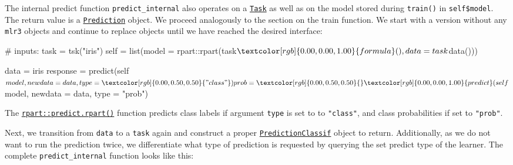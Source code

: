 \documentclass[]{article}
\newenvironment{Shaded}{}{}
\newcommand{\CommentTok}[1]{\textcolor[rgb]{0.00,0.50,0.00}{#1}}
\newcommand{\DataTypeTok}[1]{#1}
\newcommand{\KeywordTok}[1]{\textcolor[rgb]{0.00,0.00,1.00}{#1}}
\newcommand{\NormalTok}[1]{#1}
\newcommand{\OperatorTok}[1]{#1}
\newcommand{\StringTok}[1]{\textcolor[rgb]{0.00,0.50,0.50}{#1}}
\renewenvironment{Shaded} {\begin{snugshade}\small} {\end{snugshade}}
\begin{document}
The internal predict function \texttt{predict\_internal} also operates on a \href{https://mlr3.mlr-org.com/reference/Task.html}{\texttt{Task}} as well as on the model stored during \texttt{train()} in \texttt{self\$model}.
The return value is a \href{https://mlr3.mlr-org.com/reference/Prediction.html}{\texttt{Prediction}} object.
We proceed analogously to the section on the train function.
We start with a version without any \texttt{mlr3} objects and continue to replace objects until we have reached the desired interface:

\begin{Shaded}
\begin{Highlighting}[]
\CommentTok{# inputs:}
\NormalTok{task =}\StringTok{ }\KeywordTok{tsk}\NormalTok{(}\StringTok{"iris"}\NormalTok{)}
\NormalTok{self =}\StringTok{ }\KeywordTok{list}\NormalTok{(}\DataTypeTok{model =}\NormalTok{ rpart}\OperatorTok{::}\KeywordTok{rpart}\NormalTok{(task}\OperatorTok{$}\KeywordTok{formula}\NormalTok{(), }\DataTypeTok{data =}\NormalTok{ task}\OperatorTok{$}\KeywordTok{data}\NormalTok{()))}

\NormalTok{data =}\StringTok{ }\NormalTok{iris}
\NormalTok{response =}\StringTok{ }\KeywordTok{predict}\NormalTok{(self}\OperatorTok{$}\NormalTok{model, }\DataTypeTok{newdata =}\NormalTok{ data, }\DataTypeTok{type =} \StringTok{"class"}\NormalTok{)}
\NormalTok{prob =}\StringTok{ }\KeywordTok{predict}\NormalTok{(self}\OperatorTok{$}\NormalTok{model, }\DataTypeTok{newdata =}\NormalTok{ data, }\DataTypeTok{type =} \StringTok{"prob"}\NormalTok{)}
\end{Highlighting}
\end{Shaded}

The \href{https://www.rdocumentation.org/packages/rpart/topics/predict.rpart}{\texttt{rpart::predict.rpart()}} function predicts class labels if argument \texttt{type} is set to to \texttt{"class"}, and class probabilities if set to \texttt{"prob"}.

Next, we transition from \texttt{data} to a \texttt{task} again and construct a proper \href{https://mlr3.mlr-org.com/reference/PredictionClassif.html}{\texttt{PredictionClassif}} object to return.
Additionally, as we do not want to run the prediction twice, we differentiate what type of prediction is requested by querying the set predict type of the learner.
The complete \texttt{predict\_internal} function looks like this:
\end{document}
